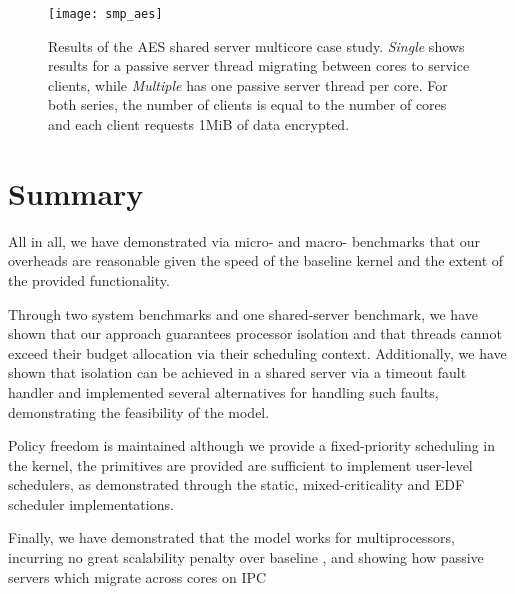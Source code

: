 \begin{figure}[ht] 
    \centering
    \texttt{[image: smp\_aes]}
    \caption[Results of the AES shared server multicore case study.]{Results of the AES shared server multicore case study. \emph{Single} shows results for a 
        passive server thread migrating between cores to service clients, while \emph{Multiple} has one
        passive server thread per core. For both series, the number of clients is equal to the number of
        cores and each client requests 1MiB of data encrypted. }
    \label{f:evaluation-smp-aes}
\end{figure}

\section{Summary}

All in all, we have demonstrated via micro- and macro- benchmarks that our overheads are
reasonable given the speed of the baseline kernel and the extent of the provided
functionality. 

Through two system benchmarks and one shared-server benchmark, we have shown
that our approach guarantees processor isolation and that threads cannot exceed
their budget allocation via their scheduling context. Additionally, we have
shown that isolation can be achieved in a shared server via a timeout fault
handler and implemented several alternatives for handling such faults,
demonstrating the feasibility of the model. 

Policy freedom is maintained although we provide a fixed-priority scheduling in the kernel, the primitives are provided are sufficient to implement user-level schedulers, 
as demonstrated through the static, mixed-criticality and EDF scheduler
implementations. 

Finally, we have demonstrated that the model works for multiprocessors,
incurring no great scalability penalty over baseline \selfour, 
and showing how passive servers which migrate across cores on \gls{IPC}
